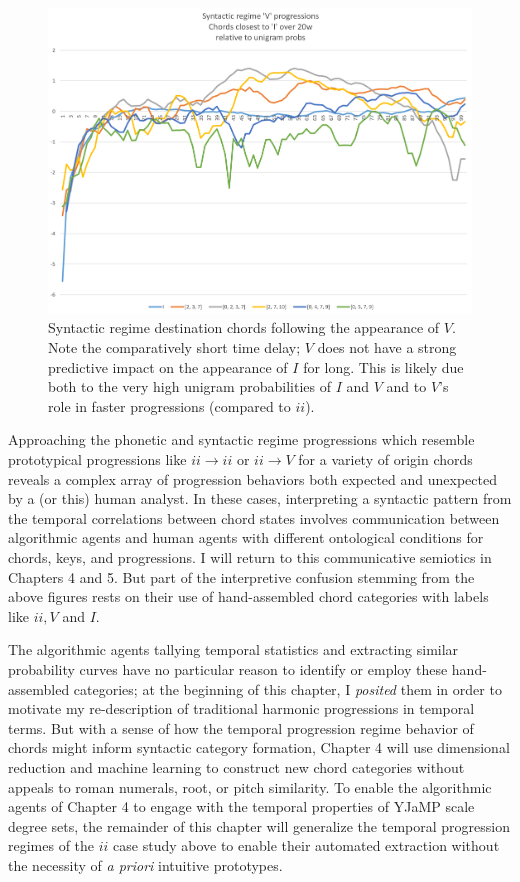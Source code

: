 \begin{figure}[h]
	\caption{Syntactic regime destination chords following the appearance of $V$.  Note the comparatively short time delay; $V$ does not have a strong predictive impact on the appearance of $I$ for long.  This is likely due both to the very high unigram probabilities of $I$ and $V$ and to $V$'s role in faster progressions (compared to $ii$).}
	\label{V_syntactic}
	\centering
	\includegraphics[width=6in]{V_syntactic.png}
\end{figure}

Approaching the phonetic and syntactic regime progressions which resemble prototypical progressions like $ii \rightarrow ii$ or $ii \rightarrow V$ for a variety of origin chords reveals a complex array of progression behaviors both expected and unexpected by a (or this) human analyst.  In these cases, interpreting a syntactic pattern from the temporal correlations between chord states involves communication between algorithmic agents and human agents with different ontological conditions for chords, keys, and progressions.  I will return to this communicative semiotics in Chapters 4 and 5.  But part of the interpretive confusion stemming from the above figures rests on their use of hand-assembled chord categories with labels like $ii,V$ and $I$.

The algorithmic agents tallying temporal statistics and extracting similar probability curves have no particular reason to identify or employ these hand-assembled categories; at the beginning of this chapter, I \emph{posited} them in order to motivate my re-description of traditional harmonic progressions in temporal terms.  But with a sense of how the temporal progression regime behavior of chords might inform syntactic category formation, Chapter 4 will use dimensional reduction and machine learning to construct new chord categories without appeals to roman numerals, root, or pitch similarity.  To enable the algorithmic agents of Chapter 4 to engage with the temporal properties of YJaMP scale degree sets, the remainder of this chapter will generalize the temporal progression regimes of the $ii$ case study above to enable their automated extraction without the necessity of \emph{a priori} intuitive prototypes.

